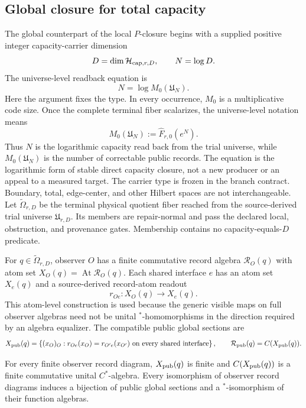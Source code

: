 \subsection{Global closure for total capacity}
\label{sec:n-closure}

The global counterpart of the local \(P\)-closure begins with a supplied
positive integer capacity-carrier dimension
\[
D=\dim\mathcal H_{{\rm cap},r,D},
\qquad N=\log D.
\]
The universe-level readback equation is
\[
\boxed{N=\log M_0(\mathfrak U_N)}.
\]
Here the argument fixes the type. In every occurrence, \(M_0\) is a
multiplicative code size. Once the complete terminal fiber scalarizes, the
universe-level notation means
\[
M_0(\mathfrak U_N):=\widehat F_{r,0}(e^N).
\]
Thus \(N\) is the logarithmic capacity read back from the trial universe,
while \(M_0(\mathfrak U_N)\) is the number of correctable public records. The
equation is the logarithmic form of stable direct capacity closure, not a new
producer or an appeal to a measured target.
The carrier type is frozen in the branch contract. Boundary, total,
edge-center, and other Hilbert spaces are not interchangeable. Let
\(\widetilde\Omega_{r,D}\) be the terminal physical quotient fiber reached
from the source-derived trial universe \(\mathfrak U_{r,D}\). Its members are
repair-normal and pass the declared local, obstruction, and provenance gates.
Membership contains no capacity-equals-\(D\) predicate.

For \(q\in\widetilde\Omega_{r,D}\), observer \(O\) has a finite commutative
record algebra \(\mathcal R_O(q)\) with atom set
\(X_O(q)=\operatorname{At}\mathcal R_O(q)\). Each shared interface \(e\)
has an atom set \(X_e(q)\) and a source-derived record-atom readout
\[
r_{Oe}:X_O(q)\longrightarrow X_e(q).
\]
This atom-level construction is used because the generic visible maps on full
observer algebras need not be unital \(^*\)-homomorphisms in the direction
required by an algebra equalizer. The compatible public global sections are
\[
X_{\rm pub}(q)=
\left\{(x_O)_O:
r_{Oe}(x_O)=r_{O'e}(x_{O'})
\text{ on every shared interface}\right\},
\qquad
\mathcal R_{\rm pub}(q)=C(X_{\rm pub}(q)).
\]

\begin{theorem}\label{thm:public-global-sections}
For every finite observer record diagram, \(X_{\rm pub}(q)\) is finite and
\(C(X_{\rm pub}(q))\) is a finite commutative unital \(C^*\)-algebra. Every
isomorphism of observer record diagrams induces a bijection of public global
sections and a \(^*\)-isomorphism of their function algebras.
\end{theorem}

